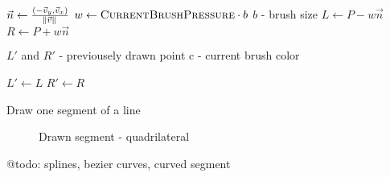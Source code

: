 	\begin{pseudocode}[H]
    	\begin{algorithmic}
                  \State $ \vec{n} \gets \frac{(-\vec{v}_y, \vec{v}_x)}{\norm{\vec{v}}} $        
                  \State $ w \gets \Call{CurrentBrushPressure}{} \cdot b $ \Comment $b$ - brush size
                  \State $L \gets P - w\vec{n}$
                  \State $R \gets P + w\vec{n}$

                  \State {}
                  \State {} \Comment $L'$ and $R'$ - previousely drawn point
                  \State {}
                  \State {}
                  \State {}
                  \State {}
                  \State {} \Comment c - current brush color

                  \State $L' \gets L$
                  \State $R' \gets R$
              \EndFunction
           \end{algorithmic}
      	   \caption{Draw one segment of a line}
          \label{alg:draw-segment-quadrilateral}
       \end{pseudocode}
       
      \begin{figure}
      	\centering
          \caption{Drawn segment - quadrilateral}
          \label{fig:draw-segment-quadrilateral}
      \end{figure}

@todo: splines, bezier curves, curved segment